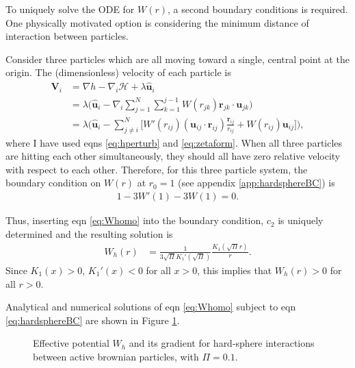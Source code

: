 \documentclass[twocolumn,amsmath,amssymb,aps]{revtex4-1}%
\begin{document}

To uniquely solve the ODE for $W(r)$, a second boundary conditions is required.
One physically motivated option is considering the minimum distance of
interaction between particles.

Consider three particles which are all moving toward a single, central point at
the origin.
The (dimensionless) velocity of each particle is
\begin{align}\label{eq:3hardspherevelocities}
  \bm{V}_i
  &=\nabla h -\nabla_i\mathcal{H} + \lambda \bm{\hat{u}}_i\nonumber\\
  &=\lambda \bigg(\bm{\hat{u}}_i-\nabla_i\sum_{j=1}^N\sum_{k=1}^{j-1}W(r_{jk})
  \bm{r}_{jk}\cdot\bm{u}_{jk}\bigg)\nonumber\\
  &=\lambda \bigg(\bm{\hat{u}}_i-\sum_{j\neq i}^N \bigg[W'(r_{ij})
    (\bm{u}_{ij}\cdot\bm{r}_{ij})\frac{\bm{r}_{ij}}{r_{ij}}
    +W(r_{ij})\bm{u}_{ij}\bigg]\bigg),
\end{align}
where I have used eqns \ref{eq:hperturb} and \ref{eq:zetaform}. When all three
particles are hitting each other simultaneously, they should all have zero
relative velocity with respect to each other. Therefore, for this three
particle system, the boundary condition on $W(r)$ at $r_0=1$ (see appendix
\ref{app:hardsphereBC}) is
\begin{align}\label{eq:hardsphereBC}
  1-3W'(1)-3W(1)=0.
\end{align}


Thus, inserting eqn \ref{eq:Whomo} into the boundary condition, $c_2$ is
uniquely determined and the resulting solution is
\begin{align}
  W_h(r) &= \frac{1}{3\sqrt{\Pi}K_1'(\sqrt{\Pi})}\frac{K_1(\sqrt{\Pi}r)}{r}.
\end{align}
Since $K_1(x)>0$, $K_1'(x)<0$ for all $x>0$, this implies that $W_h(r)>0$
for all $r>0$.

Analytical and numerical solutions of eqn \ref{eq:Whomo} subject to eqn
\ref{eq:hardsphereBC} are shown in Figure \ref{fig:1}.

\begin{figure}[!t]
  \subfloat{\label{fig:1b}}
  \caption{\protect{} Effective potential $W_h$ and
    \protect{} its gradient for hard-sphere interactions between
    active brownian particles, with $\Pi=0.1$.}\label{fig:1}
\end{figure}
\end{document}

